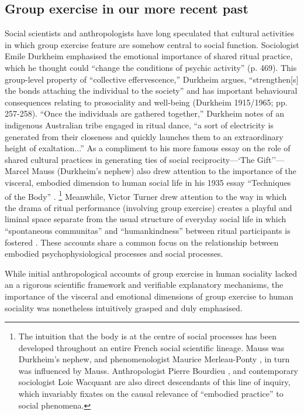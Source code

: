 \begin{CJK}{UTF8}{gbsn}
\subsection{Group exercise in our more recent past}
Social scientists and anthropologists have long speculated that cultural activities in which group exercise feature are somehow central to social function.  Sociologist Emile Durkheim emphasised the emotional importance of shared ritual practice, which he thought could ``change the conditions of psychic activity'' (p. 469).  This group-level property of ``collective effervescence,'' Durkheim argues, ``strengthen[s] the bonds attaching the individual to the society'' and has important behavioural consequences relating to prosociality and well-being (Durkheim 1915/1965; pp. 257-258). ``Once the individuals are gathered together,'' Durkheim notes of an indigenous Australian tribe engaged in ritual dance, ``a sort of electricity is generated from their closeness and quickly launches them to an extraordinary height of exaltation...''  As a compliment to his more famous essay on the role of shared cultural practices in generating ties of social reciprocity---`The Gift''---Marcel Mauss (Durkheim's nephew) also drew attention to the importance of the visceral, embodied dimension to human social life in his 1935 essay ``Techniques of the Body'' \citep{Mauss1935}.
\footnote{The intuition that the body is at the centre of social processes has been developed throughout an entire French social scientific lineage.  Mauss was Durkheim's nephew, and phenomenologist Maurice Merleau-Ponty \citep{Merleau-Ponty1956}, in turn was influenced by Mauss.  Anthropologist Pierre Bourdieu \citep{Bourdieu1990}, and contemporary sociologist Loic Wacquant \citep{Wacquant2004} are also direct descendants of this line of inquiry, which invariably fixates on the causal relevance of ``embodied practice'' to social phenomena.}
Meanwhile, Victor Turner drew attention to the way in which the drama of ritual performance (involving group exercise) creates a playful and liminal space separate from the usual structure of everyday social life in which ``spontaneous communitas'' and ``humankindness'' between ritual participants is fostered \citep{Turner1974}.  These accounts share a common focus on the relationship between embodied psychophysiological processes and social processes.

While initial anthropological accounts of group exercise in human sociality lacked an a rigorous scientific framework and verifiable explanatory mechanisms, the importance of the visceral and emotional dimensions of group exercise to human sociality was nonetheless intuitively grasped and duly emphasised.


\end{CJK}
